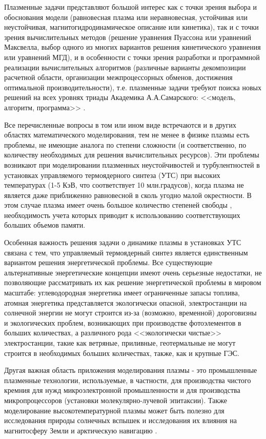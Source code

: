 Плазменные задачи представляют большой интерес как с точки зрения выбора и обоснования модели (равновесная плазма или неравновесная, устойчивая или неустойчивая, магнитогидродинамическое описание или кинетика), так и с точки зрения  вычислительных методов (решение уравнения Пуассона или уравнений Максвелла, выбор одного из многих вариантов решения кинетического уравнения или уравнений МГД), и в особенности с точки зрения разработки и программной реализации вычислительных алгоритмов (различные варианты декомпозиции расчетной области, организации межпроцессорных обменов, достижения оптимальной производительности), т.е. плазменные задачи требуют поиска новых решений на всех уровнях триады Академика А.А.Самарского: <<модель, алгоритм, программа>> \cite{SamarskiMatMod}.  

Все перечисленные вопросы в том или ином виде встречаются и в других областях математического моделирования, тем не менее в физике плазмы есть проблемы, не имеющие аналога по степени сложности (и соответственно, по количеству необходимых для решения вычислительных ресурсов). Эти проблемы возникают при моделировании плазменных неустойчивостей и турбулентностей в установках управляемого термоядерного синтеза (УТС) при высоких температурах (1-5 КэВ, что соответствует 10 млн.градусов), когда плазма не является даже приближенно равновесной в сколь угодно малой окрестности. В этом случае плазма имеет очень большое количество степеней свободы \cite{MohographyKhoroshevsky}, необходимость учета которых приводит к использованию соответствующих больших объемов памяти.

Особенная важность решения задачи о динамике плазмы в установках УТС связана с тем, что управляемый термоядерный синтез является единственным вариантом решения энергетической проблемы. Все существующие альтернативные энергетические концепции имеют очень серьезные недостатки, не позволяющие рассматривать их как решение энергетической проблемы в мировом масштабе: углеводородная энергетика имеет ограниченные запасы топлива, атомная энергетика представляется экологически опасной, электростанции на солнечной энергии не могут строится из-за (возможно, временной) дороговизны и экологических проблем, возникающих при производстве фотоэлементов в больших количествах, а различного рода <<экологически чистые>> электростанции, такие как ветряные, приливные, геотермальные не могут строится в необходимых больших количествах, также, как и крупные ГЭС.

Другая важная область приложения моделирования плазмы - это промышленные плазменные технологии, используемые, в частности, для производства чистого кремния для нужд микроэлектронной промышленности и для производства микропроцессоров (установки молекулярно-лучевой эпитаксии). Также моделирование высокотемпературной плазмы может быть полезно для исследования природы солнечных вспышек и исследования их влияния на магнитосферу Земли и арктическую навигацию \cite{RussellIEEE}.
	
